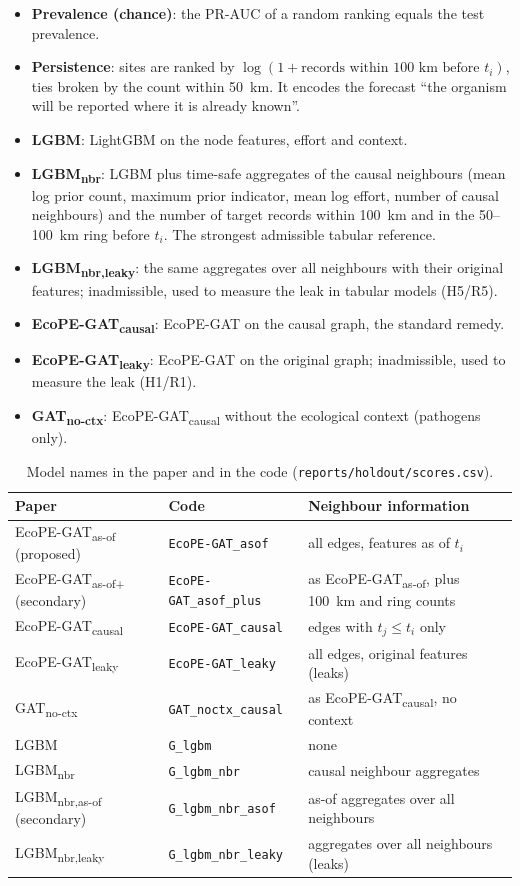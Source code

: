 \documentclass[a4paper,fleqn]{cas-sc}
\newcommand{\Masof}{\mbox{EcoPE-GAT\textsubscript{as-of}}}
\newcommand{\Masofplus}{\mbox{EcoPE-GAT\textsubscript{as-of+}}}
\newcommand{\Mcausal}{\mbox{EcoPE-GAT\textsubscript{causal}}}
\newcommand{\Mleaky}{\mbox{EcoPE-GAT\textsubscript{leaky}}}
\newcommand{\Mnoctx}{\mbox{GAT\textsubscript{no-ctx}}}
\newcommand{\Lg}{\mbox{LGBM}}
\newcommand{\Lnbr}{\mbox{LGBM\textsubscript{nbr}}}
\newcommand{\Lleaky}{\mbox{LGBM\textsubscript{nbr,leaky}}}
\newcommand{\Lasof}{\mbox{LGBM\textsubscript{nbr,as-of}}}
\begin{document}
\begin{itemize}[leftmargin=1.4em]
  \item \textbf{Prevalence (chance)}: the PR-AUC of a random ranking equals the test prevalence.
  \item \textbf{Persistence}: sites are ranked by $\log(1+\text{records within 100~km before } t_i)$, ties broken by the count within 50~km. It encodes the forecast ``the organism will be reported where it is already known''.
  \item \textbf{\Lg}: LightGBM on the node features, effort and context.
  \item \textbf{\Lnbr}: \Lg{} plus time-safe aggregates of the causal neighbours (mean log prior count, maximum prior indicator, mean log effort, number of causal neighbours) and the number of target records within 100~km and in the 50--100~km ring before $t_i$. The strongest admissible tabular reference.
  \item \textbf{\Lleaky}: the same aggregates over all neighbours with their original features; inadmissible, used to measure the leak in tabular models (H5/R5).
  \item \textbf{\Mcausal}: EcoPE-GAT on the causal graph, the standard remedy.
  \item \textbf{\Mleaky}: EcoPE-GAT on the original graph; inadmissible, used to measure the leak (H1/R1).
  \item \textbf{\Mnoctx}: \Mcausal{} without the ecological context (pathogens only).
\end{itemize}

\begin{table}[t]
\centering
\caption{Model names in the paper and in the code (\texttt{reports/holdout/scores.csv}).}
\label{tab:models}
\small
\begin{tabular}{lll}
\toprule
Paper & Code & Neighbour information \\
\midrule
\Masof{} (proposed) & \texttt{EcoPE-GAT\_asof} & all edges, features as of $t_i$ \\
\Masofplus{} (secondary) & \texttt{EcoPE-GAT\_asof\_plus} & as \Masof{}, plus 100~km and ring counts \\
\Mcausal & \texttt{EcoPE-GAT\_causal} & edges with $t_j \leq t_i$ only \\
\Mleaky & \texttt{EcoPE-GAT\_leaky} & all edges, original features (leaks) \\
\Mnoctx & \texttt{GAT\_noctx\_causal} & as \Mcausal{}, no context \\
\Lg & \texttt{G\_lgbm} & none \\
\Lnbr & \texttt{G\_lgbm\_nbr} & causal neighbour aggregates \\
\Lasof{} (secondary) & \texttt{G\_lgbm\_nbr\_asof} & as-of aggregates over all neighbours \\
\Lleaky & \texttt{G\_lgbm\_nbr\_leaky} & aggregates over all neighbours (leaks) \\
\bottomrule
\end{tabular}
\end{table}
\end{document}
